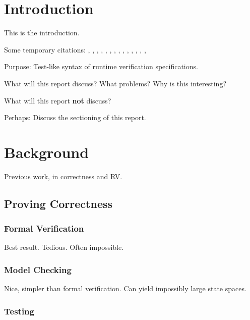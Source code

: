 \documentclass[a4paper,11pt]{kth-mag}
\begin{document}
\pagestyle{newchap}
\tableofcontents*
\mainmatter


\pagestyle{newchap}
\chapter{Introduction}

This is the introduction.

Some temporary citations:
\cite{hoare69}, \cite{floyd67}, \cite{pnueli77},
\cite{leucker09abriefaccount}, \cite{bauer06monitoring}, \cite{bauer08goodbadugly}, \cite{delgado04taxonomy}, \cite{meyer92applyingdbc},
\cite{rosenblum95practicalassertions}, \cite{bartetzko01jass},
\cite{bodden04lightweightltl}, \cite{bodden05efficientrv},
\cite{becksmalltalktesting}, \cite{fowlerxunit},
\cite{matusiak09aoppy}

Purpose: Test-like syntax of runtime verification specifications.

What will this report discuss? What problems? Why is this interesting?

What will this report \textbf{not} discuss?

Perhaps: Discuss the sectioning of this report.

\pagestyle{newchap}
\chapter{Background}

Previous work, in correctness and RV.

\section{Proving Correctness}

\subsection{Formal Verification}

Best result. Tedious. Often impossible.

\subsection{Model Checking}

Nice, simpler than formal verification. Can yield impossibly large state spaces.

\subsection{Testing}
\end{document}
